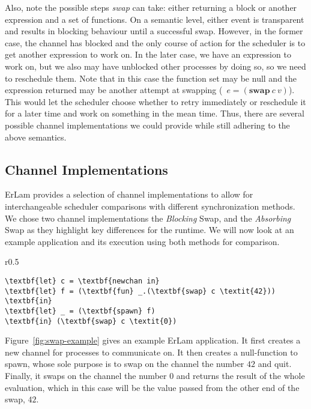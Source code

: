 Also, note the possible steps \emph{swap} can take: either returning a block
or another expression and a set of functions. On a semantic level,
either event is transparent and results in blocking behaviour until a successful swap.
However, in the former case, the channel has blocked and the only course of 
action for the scheduler is to get another expression to work on. In the 
later case, we have an expression to work on, but we also may have unblocked 
other processes by doing so, so we need to reschedule them. 
Note that in this case the function set may be null and the expression returned may be
another attempt at swapping (\ie~$e = (\textbf{swap}\:c\:v)$). This would let 
the scheduler choose whether to retry immediately or reschedule it for a later
time and work on something in the mean time. Thus, there are several possible
channel implementations we could provide while still adhering to the above
semantics.

\subsection{Channel Implementations}\label{sec:channel implementations}

ErLam provides a selection of channel implementations to allow for 
interchangeable scheduler comparisons with different synchronization methods.
We chose two channel implementations the 
{\sl Blocking} Swap, and the {\sl Absorbing} Swap as they highlight key differences
for the runtime. We will now look at an example application and its execution
using both methods for comparison.

\begin{wrapfigure}{r}{0.5\textwidth}
    \centering
{\footnotesize
\begin{BVerbatim}[commandchars=\\\{\}]
\textbf{let} c = \textbf{newchan in}
\textbf{let} f = (\textbf{fun} _.(\textbf{swap} c \textit{42})) \textbf{in}
\textbf{let} _ = (\textbf{spawn} f)
\textbf{in} (\textbf{swap} c \textit{0})
\end{BVerbatim}
}
    \caption{
        A simple ErLam application which swaps on a channel before returning.}
    \label{fig:swap-example}
\end{wrapfigure}

Figure~\ref{fig:swap-example} gives an example ErLam application. It first 
creates a new channel for processes to communicate on. It then creates a 
null-function to spawn, whose sole purpose is to swap on the channel the number
$42$ and quit. Finally, it swaps on the channel the number $0$ and returns
the result of the whole evaluation, which in this case will be the value passed
from the other end of the swap, $42$. 

